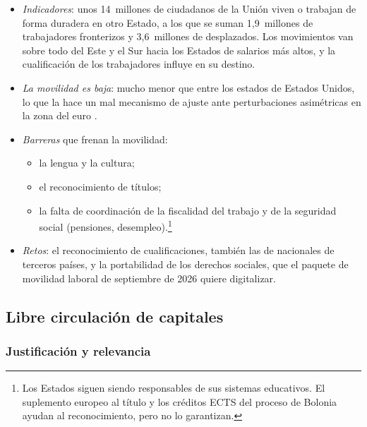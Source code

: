 \documentclass[11pt]{article}
\begin{document}
\begin{itemize}
\item \emph{Indicadores}: unos 14~millones de ciudadanos de la Unión viven o trabajan de forma duradera en otro Estado, a los que se suman 1,9~millones de trabajadores fronterizos y 3,6~millones de desplazados\nocite{CE2026Movilidad}. Los movimientos van sobre todo del Este y el Sur hacia los Estados de salarios más altos, y la cualificación de los trabajadores influye en su destino.
\item[(--)] \emph{La movilidad es baja}: mucho menor que entre los estados de Estados Unidos, lo que la hace un mal mecanismo de ajuste ante perturbaciones asimétricas en la zona del euro .
\item \emph{Barreras} que frenan la movilidad:
  \begin{itemize}
  \item la lengua y la cultura;
  \item el reconocimiento de títulos;
  \item la falta de coordinación de la fiscalidad del trabajo y de la seguridad social (pensiones, desempleo).\footnote{Los Estados siguen siendo responsables de sus sistemas educativos. El suplemento europeo al título y los créditos ECTS del proceso de Bolonia ayudan al reconocimiento, pero no lo garantizan.}
  \end{itemize}
\item \emph{Retos}: el reconocimiento de cualificaciones, también las de nacionales de terceros países, y la portabilidad de los derechos sociales, que el paquete de movilidad laboral de septiembre de 2026 quiere digitalizar\nocite{CE2026Movilidad}.
\end{itemize}

\subsection{Libre circulación de capitales}\label{sec:capitales}

\subsubsection{Justificación y relevancia}\label{sec:capitales-justificacion}
\end{document}
